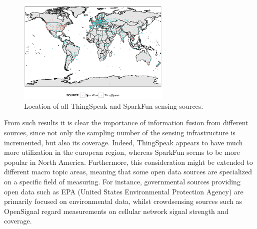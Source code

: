 \documentclass[conference]{IEEEtran}
\begin{document}
\begin{figure}[!t]
\centering
\includegraphics[width=0.65\textwidth]{img/map.eps} 
\caption{Location of all ThingSpeak and SparkFun sensing sources.}
\label{geo}
\end{figure}

From such results it is clear the importance of information fusion from different sources, since not only the sampling number of the sensing infrastructure is incremented, but also its coverage.
Indeed, ThingSpeak appears to have much more utilization in the european region, whereas SparkFun seems to be more popular in North America.
Furthermore, this consideration might be extended to different macro topic areas, meaning that some open data sources are specialized on a specific field of measuring.
For instance, governmental sources providing open data such as EPA (United States Environmental Protection Agency) \cite{epa} are primarily focused on environmental data, whilst crowdsensing sources such as OpenSignal \cite{opensignal} regard measurements on cellular network signal strength and coverage.
\\
\end{document}
